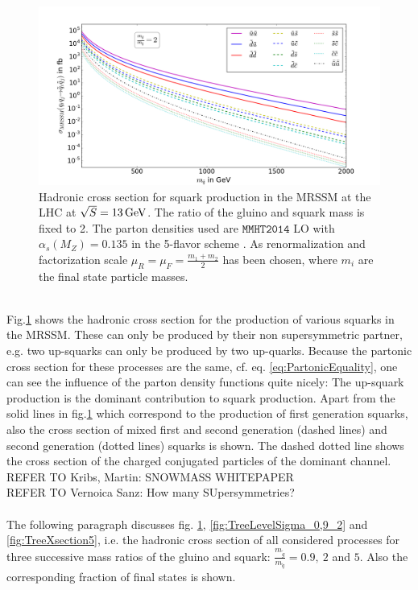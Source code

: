 \begin{figure}[!htpb]
\begin{center}
\includegraphics[scale=.45]{figures/MRSSM_q+q_sq+sq_mr=2_seperated}
\caption{Hadronic cross section for squark production in the MRSSM at the LHC at $\sqrt{S} = \unit[13]{GeV}$. The ratio of the gluino and squark mass is fixed to 2. The parton densities used are $\mathtt{MMHT2014}$ LO with $\alpha_s(M_Z) = 0.135$ in the 5-flavor scheme \cite{Harland-Lang:2014zoa}. As renormalization and factorization scale $\mu_R = \mu_F = \frac{m_1 + m_2}{2}$ has been chosen, where $m_i$ are the final state particle masses.} \label{fig:TreeXsection}
\end{center}
\end{figure}\\
Fig.\ref{fig:TreeXsection} shows the hadronic cross section for the production of various squarks in the MRSSM. These can only be produced by their non supersymmetric partner, e.g. two up-squarks can only be produced by two up-quarks. Because the partonic cross section for these processes are  the same, cf. eq. \ref{eq:PartonicEquality}, one can see the influence of the parton density functions quite nicely: The up-squark production is the dominant contribution to squark production. Apart from the solid lines in fig.\ref{fig:TreeXsection} which correspond to the production of first generation squarks, also the cross section of mixed first and second generation (dashed lines) and second generation (dotted lines) squarks is shown. The dashed dotted line shows the cross section of the charged conjugated particles of the dominant channel.\\
REFER TO Kribs, Martin: SNOWMASS WHITEPAPER\\
REFER TO Vernoica Sanz: How many SUpersymmetries?\\
\\
The following paragraph discusses fig. \ref{fig:TreeXsection}, \ref{fig:TreeLevelSigma_0,9_2} and \ref{fig:TreeXsection5}, i.e. the hadronic cross section of all considered processes for three successive mass ratios of the gluino and squark: $\frac{m_{\tilde{g}}}{m_{\tilde{q}}} = 0.9,\ 2$ and $5$. Also the corresponding fraction of final states is shown.\\
